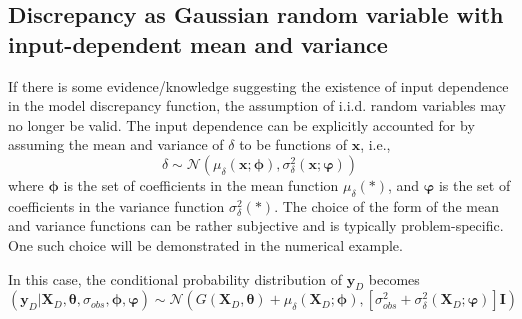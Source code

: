 \documentclass[preprint,review,12pt,3p]{elsarticle}
\begin{document}
\subsection{Discrepancy as Gaussian random variable with input-dependent mean and variance}\label{section:delta-inputdependent-GaussRV}
If there is some evidence/knowledge suggesting the existence of input dependence in the model discrepancy function, the assumption of i.i.d. random variables may no longer be valid. The input dependence can be explicitly accounted for by assuming the mean and variance of $\delta$ to be functions of $\boldsymbol{x}$, i.e., 
\begin{equation}
\delta \sim \mathcal{N} (\mu_{\delta}(\boldsymbol{x};\boldsymbol{\phi}), \sigma^2_{\delta}(\boldsymbol{x};\boldsymbol{\varphi}))
\end{equation}
where $\boldsymbol{\phi}$ is the set of coefficients in the mean function $\mu_{\delta}(*)$, and $\boldsymbol{\varphi}$ is the set of coefficients in the variance function $\sigma^2_{\delta}(*)$. The choice of the form of the mean and variance functions can be rather subjective and is typically problem-specific. One such choice will be demonstrated in the numerical example. 

In this case, the conditional probability distribution of $\boldsymbol{y}_D$ becomes
\begin{equation}
(\boldsymbol{y}_D | \boldsymbol{X}_D, \boldsymbol{\theta},\sigma_{obs},\boldsymbol{\phi}, \boldsymbol{\varphi}) \sim \mathcal{N}(G(\boldsymbol{X}_D, \boldsymbol{\theta})+\mu_{\delta}(\boldsymbol{X}_D;\boldsymbol{\phi}), [\sigma_{obs}^2+\sigma_{\delta}^2(\boldsymbol{X}_D;\boldsymbol{\varphi})] \boldsymbol{I})
\end{equation}
\end{document}
